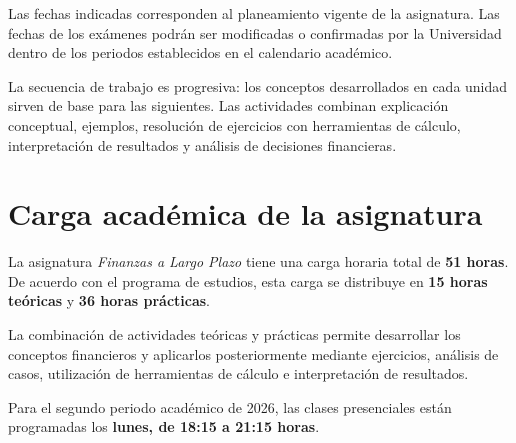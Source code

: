 \documentclass[10pt]{article}
\begin{document}
\normalsize

\noindent
Las fechas indicadas corresponden al planeamiento vigente de la asignatura.
Las fechas de los exámenes podrán ser modificadas o confirmadas por la
Universidad dentro de los periodos establecidos en el calendario académico.\parencite{armoa2026planeamiento,ua2026calendarioAcademico}

La secuencia de trabajo es progresiva: los conceptos desarrollados en cada
unidad sirven de base para las siguientes. Las actividades combinan
explicación conceptual, ejemplos, resolución de ejercicios con herramientas
de cálculo, interpretación de resultados y análisis de decisiones
financieras.



\section{Carga académica de la asignatura}

La asignatura \textit{Finanzas a Largo Plazo} tiene una carga horaria total de
\textbf{51 horas}. De acuerdo con el programa de estudios, esta carga se
distribuye en \textbf{15 horas teóricas} y \textbf{36 horas prácticas}.\parencite{uaProgramaFinanzasLargoPlazo,armoa2026planeamiento}

La combinación de actividades teóricas y prácticas permite desarrollar los
conceptos financieros y aplicarlos posteriormente mediante ejercicios,
análisis de casos, utilización de herramientas de cálculo e interpretación
de resultados.

Para el segundo periodo académico de 2026, las clases presenciales están
programadas los \textbf{lunes, de 18:15 a 21:15 horas}.\parencite{armoa2026planeamiento}
\end{document}
